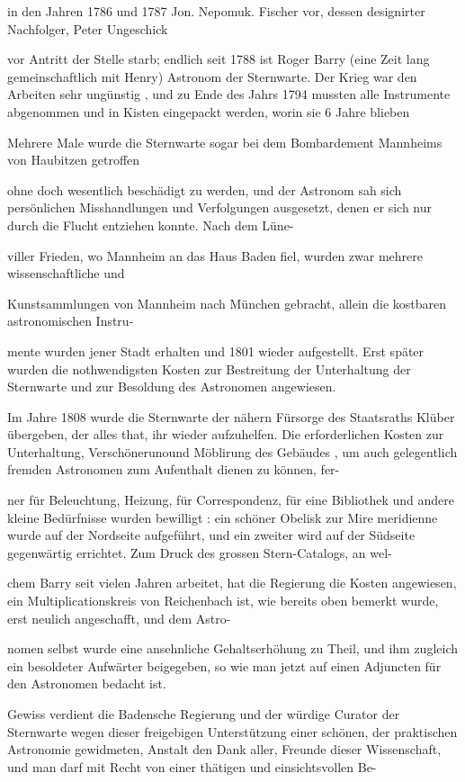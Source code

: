 \documentclass[10pt,a4paper]{article}
\begin{document}
in den Jahren 1786 und 1787 Jon. Nepomuk. Fischer vor, dessen designirter Nachfolger, Peter Ungeschick

vor Antritt der Stelle starb; endlich seit 1788 ist Roger Barry (eine Zeit lang gemeinschaftlich mit Henry) Astronom der Sternwarte. Der Krieg war den Arbeiten sehr ungünstig , und zu Ende des Jahrs 1794 mussten alle Instrumente abgenommen und in Kisten eingepackt werden, worin sie 6 Jahre blieben

Mehrere Male wurde die Sternwarte sogar bei dem Bombardement Mannheims von Haubitzen getroffen

ohne doch wesentlich beschädigt zu werden, und der Astronom sah sich persönlichen Misshandlungen und Verfolgungen ausgesetzt, denen er sich nur durch die Flucht entziehen konnte. Nach dem Lüne-

viller Frieden, wo Mannheim an das Haus Baden fiel, wurden zwar mehrere wissenschaftliche und

Kunstsammlungen von Mannheim nach München gebracht, allein die kostbaren astronomischen Instru-

mente wurden jener Stadt erhalten und 1801 wieder aufgestellt. Erst später wurden die nothwendigsten Kosten zur Bestreitung der Unterhaltung der Sternwarte und zur Besoldung des Astronomen angewiesen.

Im Jahre 1808 wurde die Sternwarte der nähern Fürsorge des Staatsraths Klüber übergeben, der alles that, ihr wieder aufzuhelfen. Die erforderlichen Kosten zur Unterhaltung, Verschönerunound Möblirung des Gebäudes , um auch gelegentlich fremden Astronomen zum Aufenthalt dienen zu können, fer-

ner für Beleuchtung, Heizung, für Correspondenz, für eine Bibliothek und andere kleine Bedürfnisse wurden bewilligt : ein schöner Obelisk zur Mire meridienne wurde auf der Nordseite aufgeführt, und ein zweiter wird auf der Südseite gegenwärtig errichtet. Zum Druck des grossen Stern-Catalogs, an wel-

chem Barry seit vielen Jahren arbeitet, hat die Regierung die Kosten angewiesen, ein Multiplicationskreis von Reichenbach ist, wie bereits oben bemerkt wurde, erst neulich angeschafft, und dem Astro-

nomen selbst wurde eine ansehnliche Gehaltserhöhung zu Theil, und ihm zugleich ein besoldeter Aufwärter beigegeben, so wie man jetzt auf einen Adjuncten für den Astronomen bedacht ist.

Gewiss verdient die Badensche Regierung und der würdige Curator der Sternwarte wegen dieser freigebigen Unterstützung einer schönen, der praktischen Astronomie gewidmeten, Anstalt den Dank aller, Freunde dieser Wissenschaft, und man darf mit Recht von einer thätigen und einsichtsvollen Be-
\end{document}
